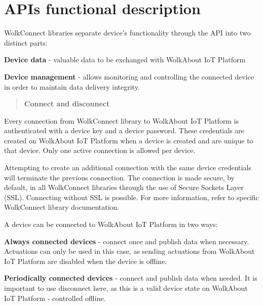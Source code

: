  \section*{A\+PI\textquotesingle{}s functional description}



 Wolk\+Connect libraries separate device’s functionality through the A\+PI into two distinct parts\+:


\begin{DoxyItemize}
\item {\bfseries Device data} -\/ valuable data to be exchanged with Wolk\+About IoT Platform
\item {\bfseries Device management} -\/ allows monitoring and controlling the connected device in order to maintain data delivery integrity.
\end{DoxyItemize}





\label{_connect-and-disconnect}%
 \begin{quote}
{\bfseries Connect and disconnect} \end{quote}
Every connection from Wolk\+Connect library to Wolk\+About IoT Platform is authenticated with a device key and a device password. These credentials are created on Wolk\+About IoT Platform when a device is created and are unique to that device. Only one active connection is allowed per device.

Attempting to create an additional connection with the same device credentials will terminate the previous connection. The connection is made secure, by default, in all Wolk\+Connect libraries through the use of Secure Sockets Layer (S\+SL). Connecting without S\+SL is possible. For more information, refer to specific Wolk\+Connect library documentation.

A device can be connected to Wolk\+About IoT Platform in two ways\+:


\begin{DoxyItemize}
\item {\bfseries Always connected devices} -\/ connect once and publish data when necessary. Actuations can only be used in this case, as sending actuations from Wolk\+About IoT Platform are disabled when the device is offline.
\item {\bfseries Periodically connected devices} -\/ connect and publish data when needed. It is important to use disconnect here, as this is a valid device state on Wolk\+About IoT Platform -\/ controlled offline.
\end{DoxyItemize}

